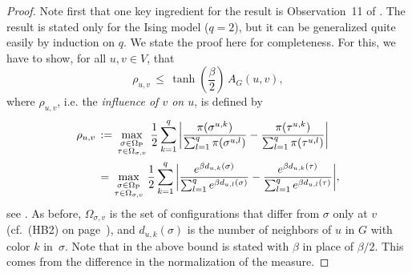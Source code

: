 \documentclass{dis}
\theoremstyle{citing}
\begin{document}
\begin{proof}
Note first that one key ingredient for the result is Observation~11 
of \cite{Ha}. The result is stated only for the Ising model ($q=2$), 
but it can be generalized quite easily by induction on $q$.
We state the proof here for completeness.
For this, we have to show, for all $u,v\in V$, that 
\[
\rho_{u,v} \,\le\, \tanh\left(\frac{\beta}{2}\right)\,A_G(u,v),
\]
where $\rho_{u,v}$, i.e. the \emph{influence of $v$ on $u$}, 
is defined by 
\[\begin{split}
\rho_{u,v} \,&:=\, 
\max_{\substack{\sigma\in{{\Omega}_{\rm P}}\\ \tau\in{\Omega}_{\sigma,v}}}\,
\frac12 \sum_{k=1}^q {\left\vert {
	\frac{\pi(\sigma^{u,k})}{\sum_{l=1}^q\pi(\sigma^{u,l})} -
	\frac{\pi(\tau^{u,k})}{\sum_{l=1}^q\pi(\tau^{u,l})}} \right\vert} \\
&=\, \max_{\substack{\sigma\in{{\Omega}_{\rm P}}\\ \tau\in{\Omega}_{\sigma,v}}}\,
\frac12 \sum_{k=1}^q {\left\vert {
	\frac{e^{\beta d_{u,k}(\sigma)}}
		{\sum_{l=1}^q e^{\beta d_{u,l}(\sigma)}} -
	\frac{e^{\beta d_{u,k}(\tau)}}
		{\sum_{l=1}^q e^{\beta d_{u,l}(\tau)}}} \right\vert},
\end{split}\]
see \cite[Def.~4]{Ha}.  
As before, ${\Omega}_{\sigma,v}$ is the set of configurations that differ from 
$\sigma$ only at $v$ (cf.~(HB2) on page~\pageref{page:P-HB}), 
and $d_{u,k}(\sigma)$ is the number 
of neighbors of $u$ in $G$ with color $k$ in~$\sigma$.
Note that in \cite{Ha} the above bound is stated with $\beta$ 
in place of $\beta/2$. This comes from the difference 
in the normalization of the measure. 


\end{proof}
\end{document}
